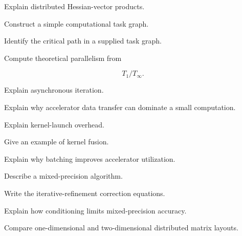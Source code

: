 \begin{exercise}[3]
Explain distributed Hessian-vector products.
\end{exercise}

\begin{exercise}[3]
Construct a simple computational task graph.
\end{exercise}

\begin{exercise}[3]
Identify the critical path in a supplied task graph.
\end{exercise}

\begin{exercise}[3]
Compute theoretical parallelism from

\[
T_1/T_\infty.
\]
\end{exercise}

\begin{exercise}[3]
Explain asynchronous iteration.
\end{exercise}

\begin{exercise}[2]
Explain why accelerator data transfer can dominate a small computation.
\end{exercise}

\begin{exercise}[3]
Explain kernel-launch overhead.
\end{exercise}

\begin{exercise}[3]
Give an example of kernel fusion.
\end{exercise}

\begin{exercise}[3]
Explain why batching improves accelerator utilization.
\end{exercise}

\begin{exercise}[2]
Describe a mixed-precision algorithm.
\end{exercise}

\begin{exercise}[3]
Write the iterative-refinement correction equations.
\end{exercise}

\begin{exercise}[3]
Explain how conditioning limits mixed-precision accuracy.
\end{exercise}

\begin{exercise}[3]
Compare one-dimensional and two-dimensional distributed matrix layouts.
\end{exercise}

